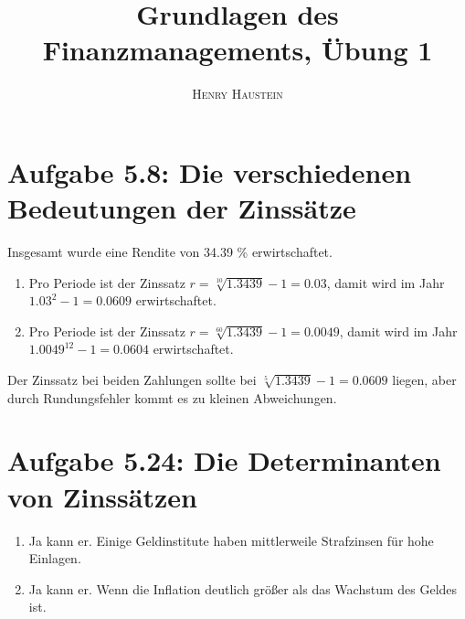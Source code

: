 \documentclass{article}
\title{\textbf{Grundlagen des Finanzmanagements, Übung 1}}
\author{\textsc{Henry Haustein}}
\date{}
\begin{document}
	\maketitle
	
	\section*{Aufgabe 5.8: Die verschiedenen Bedeutungen der Zinssätze}
	Insgesamt wurde eine Rendite von 34.39 \% erwirtschaftet.
	\begin{enumerate}[label=(\alph*)]
		\item Pro Periode ist der Zinssatz $r=\sqrt[10]{1.3439}-1=0.03$, damit wird im Jahr $1.03^2-1=0.0609$ erwirtschaftet.
		\item Pro Periode ist der Zinssatz $r=\sqrt[60]{1.3439}-1=0.0049$, damit wird im Jahr $1.0049^{12}-1=0.0604$ erwirtschaftet.
	\end{enumerate}
	Der Zinssatz bei beiden Zahlungen sollte bei $\sqrt[5]{1.3439}-1=0.0609$ liegen, aber durch Rundungsfehler kommt es zu kleinen Abweichungen.

	\section*{Aufgabe 5.24: Die Determinanten von Zinssätzen}
	\begin{enumerate}[label=(\alph*)]
		\item Ja kann er. Einige Geldinstitute haben mittlerweile Strafzinsen für hohe Einlagen.
		\item Ja kann er. Wenn die Inflation deutlich größer als das Wachstum des Geldes ist.
	\end{enumerate}
\end{document}
